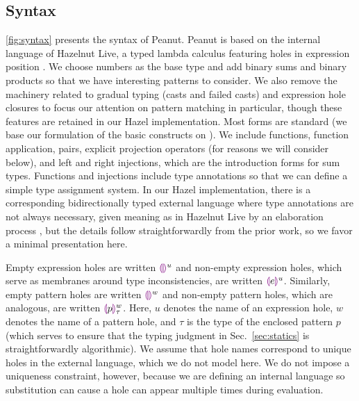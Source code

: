 \subsection{Syntax}
\label{sec:Syntax}
\autoref{fig:syntax} presents the syntax of Peanut.
Peanut is based on the internal language of Hazelnut Live, a typed lambda calculus featuring holes in expression position \cite{DBLP:journals/pacmpl/OmarVCH19}.
We choose numbers as the base type and add binary sums and binary products so that we have interesting
patterns to consider. We also remove the machinery related to gradual typing (casts and failed casts) and expression hole closures to focus our attention on pattern matching in particular, though these features are retained in our Hazel implementation. Most forms are standard (we base our formulation of the basic constructs on \citet{Harper2012}). We include functions, function application, pairs, explicit projection operators (for reasons we will consider below), and left and right injections, which are the introduction forms for sum types. Functions and injections include type annotations so that we can define a simple type assignment system. In our Hazel implementation, there is a corresponding bidirectionally typed external language where type annotations are not always necessary, given meaning as in Hazelnut Live by an elaboration process \cite{DBLP:journals/pacmpl/OmarVCH19}, but the details follow straightforwardly from the prior work, so we favor a minimal presentation here. 

Empty expression holes are written $\textcolor{violet}{\llparenthesis}\textcolor{violet}{\rrparenthesis}^{u}$ and non-empty expression holes, which serve as membranes around type inconsistencies, are written $\textcolor{violet}{\llparenthesis} e\textcolor{violet}{\rrparenthesis}^{u}$. Similarly, empty pattern holes are written $\textcolor{violet}{\llparenthesis}\textcolor{violet}{\rrparenthesis}^{w}$ and non-empty pattern holes, which are analogous, are written $\textcolor{violet}{\llparenthesis} p\textcolor{violet}{\rrparenthesis}^{w}_{\tau}$. Here, $u$ denotes the name of an expression hole, $w$ denotes the name of a pattern hole, and $\tau$ is the type of the enclosed pattern $p$ (which serves to ensure that the typing judgment in Sec.~\ref{sec:statics} is straightforwardly algorithmic).
We assume that hole names 
correspond to unique holes in the external language, which we do not model here. We do not impose a uniqueness constraint, however, because we are defining an internal language so substitution can cause a hole can appear multiple times during evaluation.

